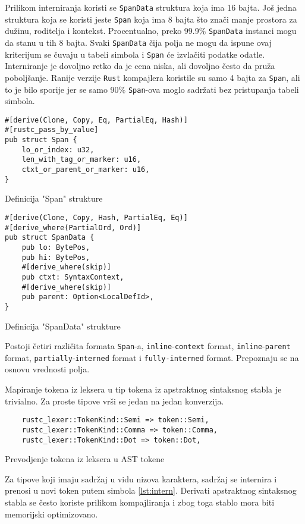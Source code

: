 Prilikom interniranja koristi se \verb|SpanData| struktura koja ima 16 bajta. Još jedna struktura koja 
se koristi jeste \verb|Span| koja ima 8 bajta što znači manje prostora za dužinu, roditelja i kontekst. 
Procentualno, preko 99.9\%  \verb|SpanData| instanci mogu da stanu u tih 8 bajta. Svaki \verb|SpanData|
čija polja ne mogu da ispune ovaj kriterijum se čuvaju u tabeli simbola i \verb|Span| će izvlačiti podatke 
odatle. Interniranje je dovoljno retko da je cena niska, ali dovoljno često da pruža poboljšanje. 
Ranije verzije \verb|Rust| kompajlera koristile su samo 4 bajta za \verb|Span|, ali to je bilo sporije 
jer se samo 90\% \verb|Span|-ova moglo sadržati bez pristupanja tabeli simbola.

\begin{listing}[H]
\begin{verbatim}
#[derive(Clone, Copy, Eq, PartialEq, Hash)]
#[rustc_pass_by_value]
pub struct Span {
    lo_or_index: u32,
    len_with_tag_or_marker: u16,
    ctxt_or_parent_or_marker: u16,
}
\end{verbatim}
\caption{Definicija "Span" strukture}
\end{listing}


\begin{listing}[H]
\begin{verbatim}
#[derive(Clone, Copy, Hash, PartialEq, Eq)]
#[derive_where(PartialOrd, Ord)]
pub struct SpanData {
    pub lo: BytePos,
    pub hi: BytePos,
    #[derive_where(skip)]
    pub ctxt: SyntaxContext,
    #[derive_where(skip)]
    pub parent: Option<LocalDefId>,
}
\end{verbatim}
\caption{Definicija "SpanData" strukture}
\end{listing}

Postoji četiri različita formata \verb|Span|-a, \verb|inline|-\verb|context| format, \verb|inline|-\verb|parent| format,
\verb|partially|-\verb|interned| format i \verb|fully-interned| format.  Prepoznaju se na osnovu vrednosti polja.


Mapiranje tokena iz leksera u tip tokena iz apstraktnog sintaksnog stabla je trivialno.
Za proste tipove vrši se jedan na jedan konverzija.

\begin{listing}[H]
\begin{verbatim}
    rustc_lexer::TokenKind::Semi => token::Semi,
    rustc_lexer::TokenKind::Comma => token::Comma,
    rustc_lexer::TokenKind::Dot => token::Dot,
\end{verbatim}
\caption{Prevodjenje tokena iz leksera u AST tokene}
\end{listing}
Za tipove koji imaju sadržaj u vidu nizova karaktera, sadržaj se internira i prenosi 
u novi token putem simbola \ref{lst:intern}. Derivati apstraktnog sintaksnog stabla se često koriste prilikom kompajliranja i zbog toga 
stablo mora biti memorijski optimizovano.

